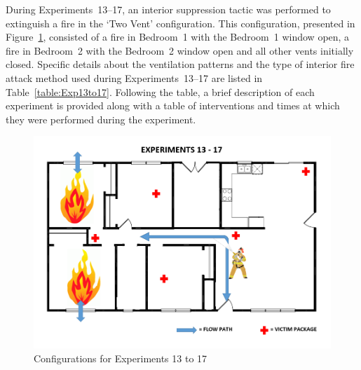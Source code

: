 \documentclass[12pt,oneside]{book}
\begin{document}
During Experiments~13--17, an interior suppression tactic was performed to extinguish a fire in the `Two Vent' configuration. This configuration, presented in Figure~\ref{fig:Two_Vent_int}, consisted of a fire in Bedroom~1 with the Bedroom~1 window open, a fire in Bedroom~2 with the Bedroom~2 window open and all other vents initially closed. Specific details about the ventilation patterns and the type of interior fire attack method used during Experiments~13--17 are listed in Table~\ref{table:Exp13to17}. Following the table, a brief description of each experiment is provided along with a table of interventions and times at which they were performed during the experiment. 


\begin{figure}[!ht]
	\centering
	\includegraphics[width=4.5in]{Figures/General/Exps13through17.png}
	\caption{Configurations for Experiments 13 to 17}
	\label{fig:Two_Vent_int}
\end{figure}
\end{document}
